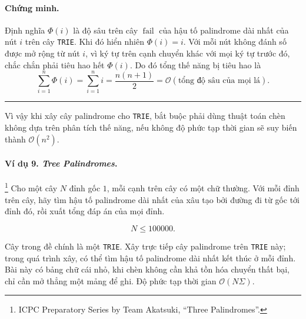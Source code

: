\documentclass[11pt]{article}
\newcommand{\Oh}{\mathcal{O}}
\newcommand{\qedmark}{\hfill\rule{0.7ex}{0.7ex}}
\begin{document}
\begin{center}
\end{center}

\paragraph{Chứng minh.}
Định nghĩa \(\Phi(i)\) là độ sâu trên cây \(\operatorname{fail}\) của hậu tố
palindrome dài nhất của nút \(i\) trên cây \texttt{TRIE}. Khi đó hiển nhiên
\(\Phi(i)=i\). Với mỗi nút không đánh số được mở rộng từ nút \(i\), vì ký tự
trên cạnh chuyển khác với mọi ký tự trước đó, chắc chắn phải tiêu hao hết
\(\Phi(i)\). Do đó tổng thế năng bị tiêu hao là
\[
\sum_{i=1}^n \Phi(i)=\sum_{i=1}^n i=\frac{n(n+1)}2
=\Oh(\text{tổng độ sâu của mọi lá}).
\]
\qedmark

Vì vậy khi xây cây palindrome cho \texttt{TRIE}, bắt buộc phải dùng thuật toán
chèn không dựa trên phân tích thế năng, nếu không độ phức tạp thời gian sẽ
suy biến thành \(\Oh(n^2)\).

\paragraph{Ví dụ 9. \emph{Tree Palindromes}.}
\footnote{ICPC Preparatory Series by Team Akatsuki, ``Three Palindromes''.}
Cho một cây \(N\) đỉnh gốc \(1\), mỗi cạnh trên cây có một chữ thường. Với mỗi
đỉnh trên cây, hãy tìm hậu tố palindrome dài nhất của xâu tạo bởi đường đi từ
gốc tới đỉnh đó, rồi xuất tổng đáp án của mọi đỉnh.

\[
N\le 100000.
\]

Cây trong đề chính là một \texttt{TRIE}. Xây trực tiếp cây palindrome trên
\texttt{TRIE} này; trong quá trình xây, có thể tìm hậu tố palindrome dài nhất
kết thúc ở mỗi đỉnh. Bài này có bảng chữ cái nhỏ, khi chèn không cần khả tồn
hóa chuyển thất bại, chỉ cần mở thẳng một mảng để ghi. Độ phức tạp thời gian
\(\Oh(N\Sigma)\).
\end{document}
